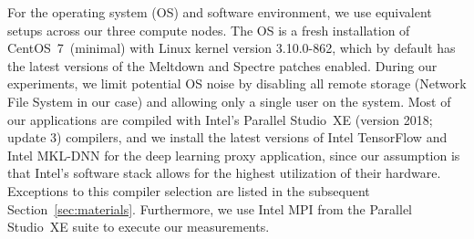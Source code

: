 For the operating system (OS) and software environment, we use equivalent setups across our three compute nodes.
The OS is a fresh installation of CentOS~7~(minimal) with Linux kernel version 3.10.0-862, which by default has the latest versions of
the Meltdown and Spectre patches enabled. During our experiments, we limit potential OS noise by disabling all
remote storage (Network File System in our case) and allowing only a single user on the system.
Most of our applications are compiled with Intel's Parallel Studio~XE (version 2018; update 3) compilers, and we
install the latest versions of Intel TensorFlow and Intel MKL-DNN for the deep learning proxy application, since
our assumption is that Intel's software stack allows for the highest utilization of their hardware.
Exceptions to this compiler selection are listed in the subsequent Section~\ref{sec:materials}.
Furthermore, we use Intel MPI from the Parallel Studio~XE suite to execute our measurements.


